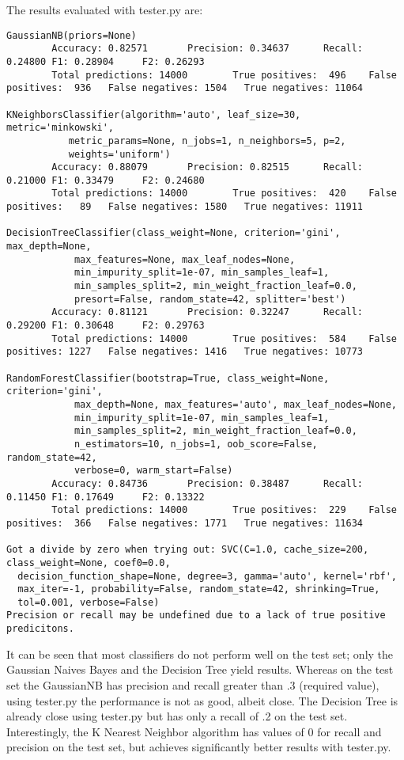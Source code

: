 \documentclass[11pt]{article} %
\begin{document}
The results evaluated with tester.py are:
{\tiny
\begin{verbatim}
GaussianNB(priors=None)
        Accuracy: 0.82571       Precision: 0.34637      Recall: 0.24800 F1: 0.28904     F2: 0.26293
        Total predictions: 14000        True positives:  496    False positives:  936   False negatives: 1504   True negatives: 11064

KNeighborsClassifier(algorithm='auto', leaf_size=30, metric='minkowski',
           metric_params=None, n_jobs=1, n_neighbors=5, p=2,
           weights='uniform')
        Accuracy: 0.88079       Precision: 0.82515      Recall: 0.21000 F1: 0.33479     F2: 0.24680
        Total predictions: 14000        True positives:  420    False positives:   89   False negatives: 1580   True negatives: 11911

DecisionTreeClassifier(class_weight=None, criterion='gini', max_depth=None,
            max_features=None, max_leaf_nodes=None,
            min_impurity_split=1e-07, min_samples_leaf=1,
            min_samples_split=2, min_weight_fraction_leaf=0.0,
            presort=False, random_state=42, splitter='best')
        Accuracy: 0.81121       Precision: 0.32247      Recall: 0.29200 F1: 0.30648     F2: 0.29763
        Total predictions: 14000        True positives:  584    False positives: 1227   False negatives: 1416   True negatives: 10773

RandomForestClassifier(bootstrap=True, class_weight=None, criterion='gini',
            max_depth=None, max_features='auto', max_leaf_nodes=None,
            min_impurity_split=1e-07, min_samples_leaf=1,
            min_samples_split=2, min_weight_fraction_leaf=0.0,
            n_estimators=10, n_jobs=1, oob_score=False, random_state=42,
            verbose=0, warm_start=False)
        Accuracy: 0.84736       Precision: 0.38487      Recall: 0.11450 F1: 0.17649     F2: 0.13322
        Total predictions: 14000        True positives:  229    False positives:  366   False negatives: 1771   True negatives: 11634

Got a divide by zero when trying out: SVC(C=1.0, cache_size=200, class_weight=None, coef0=0.0,
  decision_function_shape=None, degree=3, gamma='auto', kernel='rbf',
  max_iter=-1, probability=False, random_state=42, shrinking=True,
  tol=0.001, verbose=False)
Precision or recall may be undefined due to a lack of true positive predicitons.
\end{verbatim}
}

It can be seen that most classifiers do not perform well on the test set; only the Gaussian Naives Bayes and the Decision Tree yield results. Whereas on the test set the GaussianNB has precision and recall greater than .3 (required value), using tester.py the performance is not as good, albeit close. The Decision Tree is already close using tester.py but has only a recall of .2 on the test set. Interestingly, the K Nearest Neighbor algorithm has values of 0 for recall and precision on the test set, but achieves significantly better results with tester.py.\medskip
\end{document}
